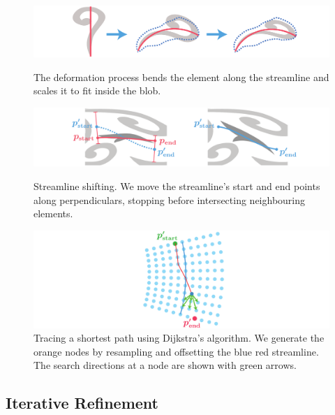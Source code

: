 \begin{figure}[h!]
\centering
\includegraphics[width=1.0\textwidth]{figures/flowpak/shape_deformation.pdf}
\caption[Shape deformation]
{\label{shape_deformation}
The deformation process bends the element along the streamline and
scales it to fit inside the blob.}
\bigskip
 \includegraphics[width=1.0\textwidth]{figures/flowpak/shift_streamline.pdf}
 \caption[Shift a streamline]
 {\label{shift_streamline}
 Streamline shifting.
 	We move the streamline's start and end points along 
	perpendiculars, stopping before intersecting neighbouring elements.}
\bigskip
\includegraphics[width=1.0\textwidth]{figures/flowpak/dijkstra.pdf}
 \caption[Trace a shortest path]
 {\label{dijkstra}
 Tracing a shortest path using Dijkstra's algorithm.  We generate the 
 orange nodes by resampling and offsetting the blue red streamline.
          The search directions at a node are shown with green arrows.}
\end{figure}

\subsection{Iterative Refinement}
\label{flowpak_iterative_refinement}

